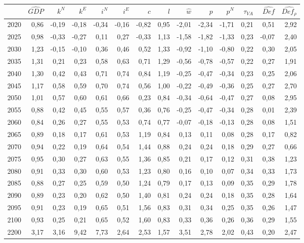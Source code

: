 \begin{tabular}{lrrrrrrrrrrrrr}
\toprule
 & $\hat{GDP}$ & $k^N$ & $k^E$ & $i^N$ & $i^E$ & $c$ & $l$ & $\hat{w}$ & $p$ & $p^N$ & $\tau_{VA}$ & $\hat{Def}$ & $\hat{Def_\rho}$ \\
\midrule
2020 & 0,86 & -0,19 & -0,18 & -0,34 & -0,16 & -0,82 & 0,95 & -2,01 & -2,34 & -1,71 & 0,21 & 0,51 & 2,92 \\
2025 & 0,98 & -0,33 & -0,27 & 0,11 & 0,27 & -0,33 & 1,13 & -1,58 & -1,82 & -1,33 & 0,23 & -0,07 & 2,40 \\
2030 & 1,23 & -0,15 & -0,10 & 0,36 & 0,46 & 0,52 & 1,33 & -0,92 & -1,10 & -0,80 & 0,22 & 0,30 & 2,05 \\
2035 & 1,31 & 0,21 & 0,23 & 0,58 & 0,63 & 0,71 & 1,29 & -0,56 & -0,78 & -0,57 & 0,22 & 0,27 & 1,91 \\
2040 & 1,30 & 0,42 & 0,43 & 0,71 & 0,74 & 0,84 & 1,19 & -0,25 & -0,47 & -0,34 & 0,23 & 0,25 & 2,06 \\
2045 & 1,17 & 0,58 & 0,59 & 0,70 & 0,74 & 0,56 & 1,00 & -0,22 & -0,49 & -0,36 & 0,25 & 0,27 & 2,70 \\
2050 & 1,01 & 0,57 & 0,60 & 0,61 & 0,66 & 0,23 & 0,84 & -0,34 & -0,64 & -0,47 & 0,27 & 0,08 & 2,95 \\
2055 & 0,88 & 0,42 & 0,45 & 0,55 & 0,57 & 0,36 & 0,76 & -0,25 & -0,47 & -0,34 & 0,28 & 0,01 & 2,39 \\
2060 & 0,84 & 0,26 & 0,27 & 0,55 & 0,53 & 0,74 & 0,77 & -0,07 & -0,18 & -0,13 & 0,28 & 0,08 & 1,51 \\
2065 & 0,89 & 0,18 & 0,17 & 0,61 & 0,53 & 1,19 & 0,84 & 0,13 & 0,11 & 0,08 & 0,28 & 0,17 & 0,82 \\
2070 & 0,94 & 0,22 & 0,19 & 0,64 & 0,54 & 1,44 & 0,88 & 0,24 & 0,24 & 0,18 & 0,29 & 0,27 & 0,66 \\
2075 & 0,95 & 0,30 & 0,27 & 0,63 & 0,55 & 1,36 & 0,85 & 0,21 & 0,17 & 0,12 & 0,31 & 0,38 & 1,23 \\
2080 & 0,91 & 0,33 & 0,30 & 0,60 & 0,53 & 1,23 & 0,80 & 0,16 & 0,10 & 0,07 & 0,34 & 0,33 & 1,73 \\
2085 & 0,88 & 0,27 & 0,25 & 0,59 & 0,50 & 1,24 & 0,79 & 0,17 & 0,13 & 0,09 & 0,35 & 0,29 & 1,78 \\
2090 & 0,89 & 0,23 & 0,20 & 0,62 & 0,50 & 1,40 & 0,81 & 0,24 & 0,24 & 0,18 & 0,35 & 0,28 & 1,64 \\
2095 & 0,91 & 0,23 & 0,19 & 0,65 & 0,51 & 1,56 & 0,83 & 0,31 & 0,34 & 0,25 & 0,35 & 0,26 & 1,47 \\
2100 & 0,93 & 0,25 & 0,21 & 0,65 & 0,52 & 1,60 & 0,83 & 0,33 & 0,36 & 0,26 & 0,36 & 0,29 & 1,55 \\
2200 & 3,17 & 3,16 & 9,42 & 7,73 & 2,64 & 2,53 & 1,57 & 3,51 & 2,78 & 2,02 & 0,43 & 0,20 & 2,47 \\
\bottomrule
\end{tabular}

